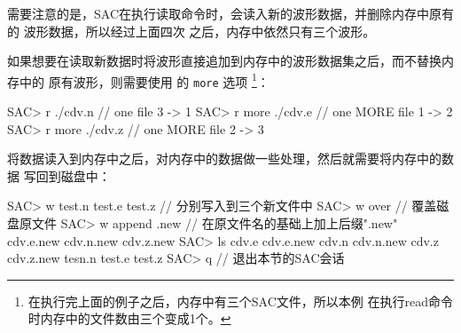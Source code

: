需要注意的是，SAC在执行读取命令时，会读入新的波形数据，并删除内存中原有的
波形数据，所以经过上面四次  之后，内存中依然只有三个波形。

如果想要在读取新数据时将波形直接追加到内存中的波形数据集之后，而不替换内存中的
原有波形，则需要使用  的 \texttt{more} 选项
\footnote{在执行完上面的例子之后，内存中有三个SAC文件，所以本例
在执行read命令时内存中的文件数由三个变成1个。}：
\begin{SACCode}
SAC> r ./cdv.n              // one file       3 -> 1
SAC> r more ./cdv.e         // one MORE file  1 -> 2
SAC> r more ./cdv.z         // one MORE file  2 -> 3
\end{SACCode}

将数据读入到内存中之后，对内存中的数据做一些处理，然后就需要将内存中的数据
写回到磁盘中：
\begin{SACCode}
SAC> w test.n test.e test.z        // 分别写入到三个新文件中
SAC> w over                        // 覆盖磁盘原文件
SAC> w append .new                 // 在原文件名的基础上加上后缀".new"
cdv.e.new cdv.n.new cdv.z.new
SAC> ls
cdv.e cdv.e.new cdv.n cdv.n.new cdv.z cdv.z.new tesn.n test.e test.z
SAC> q                             // 退出本节的SAC会话
\end{SACCode}